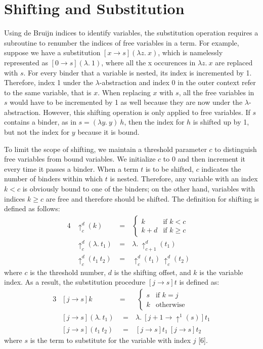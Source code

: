 \section{Shifting and Substitution} 
Using de Bruijn indices to identify variables, the substitution operation requires a subroutine to renumber the indices of free variables 
in a term. For example, suppose we have a substitution $[x\rightarrow s](\lambda z. \: x)$, 
which is namelessly represented as $[0\rightarrow s](\lambda . \: 1)$, where all the x occurences in $\lambda z . \: x$ 
are replaced with $s$. For every binder that a variable is nested, its index is incremented by 1. Therefore, index 1 under the 
$\lambda$-abstraction and index 0 in the outer context refer to the same variable, that is $x$. When replacing $x$ with $s$, all the free variables 
in $s$ would have to be incremented by 1 as well because they are now under the $\lambda$-abstraction. However, this shifting 
operation is only applied to free variables. If $s$ contains a binder, as in $s = (\lambda y . \: y) \: h$, then 
the index for $h$ is shifted up by 1, but not the index for $y$ because it is bound. 

To limit the scope of shifting, we maintain a threshold parameter $c$ to distinguish free variables from bound variables. We initialize $c$ to 
0 and then increment it every time it passes a binder. When a term $t$ is to be shifted, $c$ indicates the number of binders within which $t$  
is nested. Therefore, any variable with an index $k < c$ is obviously bound to one of the binders; on the other hand, 
variables with indices $k \geq c$ are free and therefore should be shifted. The definition for shifting is defined as follows:
\begin{alignat*}{4}
&\uparrow _c^d(k) &= &  
    \begin{cases}   
        k & \text{if $k<c$} \\
        k + d & \text{if $k \geq c$} 
    \end{cases} \\
&\uparrow _c^d(\lambda . \: t_1) \: & = \: &\lambda . \: \uparrow _{c+1}^d (t_1) & \\
&\uparrow _c^d(t_1 \: t_2) \: & = \: & \uparrow _c^d(t_1) \: \uparrow _c^d(t_2)
\end{alignat*} 
where $c$ is the threshold number, $d$ is the shifting offset, and $k$ is the variable index. As a result, the substitution 
procedure $[j \rightarrow s]t$ is defined as:
\begin{alignat*}{3}
    &[j \rightarrow s]k &=& \:  
        \begin{cases}   
            s & \text{if $k=j$} \\
            k & \text{otherwise} 
        \end{cases} \\
    &[j \rightarrow s](\lambda . \: t_1) & \: \: = \: & \lambda . \: [j + 1 \rightarrow \uparrow^1 (s)]t_1 \\
    &[j \rightarrow s](t_1 \: t_2) & \: \: = \: & [j \rightarrow s]t_1 \: [j \rightarrow s]t_2
\end{alignat*} 
where $s$ is the term to substitute for the variable with index $j$ [6].